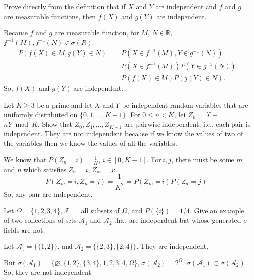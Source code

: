\documentclass[en, normal, 11pt, black]{elegantnote}
\newenvironment{exercise}[1]{\begin{tcolorbox}[colback=black!15, colframe=black!80, breakable, title=#1]}{\end{tcolorbox}}
\renewenvironment{proof}{\begin{tcolorbox}[colback=white, colframe=black!50, breakable, title=Proof. ]\setlength{\parskip}{0.8em}}{\,\\\rightline{$\square$}\end{tcolorbox}}
\begin{document}
    \begin{exercise}{2.1.6}
        Prove directly from the definition that if $X$ and $Y$ are independent and $f$ and $g$ are measurable functions, then $f(X)$ and $g(Y)$ are independent. 
    \end{exercise}

    \begin{proof}
        Because $f$ and $g$ are measurable function, for $M$, $N\in\mathbb{R}$, $f^{-1}(M), f^{-1}(N)\in\sigma(R)$. 
        \[
            \begin{aligned}
                P(f(X) \in M, g(Y) \in N) &=P\left(X \in f^{-1}(M), Y \in g^{-1}(N)\right) \\
                &=P\left(X \in f^{-1}(M)\right) P\left(Y \in g^{-1}(N)\right) \\
                &=P(f(X) \in M) P(g(Y) \in N). 
            \end{aligned}
        \]
        So, $f(X)$ and $g(Y)$ are independent. 
    \end{proof}

    \begin{exercise}{2.1.7}
        Let $K \geq 3$ be a prime and let $X$ and $Y$ be independent random variables that are uniformly distributed on $\{0,1, \ldots, K-1\} .$ For $0 \leq n<K$, let $Z_{n}=X+$ $n Y \bmod K$. Show that $Z_{0}, Z_{1}, \ldots, Z_{K-1}$ are pairwise independent, i.e., each pair is independent. They are not independent because if we know the values of two of the variables then we know the values of all the variables. 
    \end{exercise}

    \begin{proof}
        We know that $P(Z_n=i)=\frac{1}{K}$, $i\in[0,K-1]$. For $i, j$, there must be some $m$ and $n$ which satisfies $Z_n=i$, $Z_m=j$: 
        \[
            P(Z_m=i, Z_n=j)=\frac{1}{K^2}=P(Z_m=i)P(Z_n=j). 
        \]
        So, any pair are independent. 
    \end{proof}
    
    \begin{exercise}{2.1.9}
        Let $\Omega=\{1,2,3,4\}, \mathcal{F}=$ all subsets of $\Omega$, and $P(\{i\})=1 / 4$. Give an example of two collections of sets $\mathcal{A}_{1}$ and $\mathcal{A}_{2}$ that are independent but whose generated $\sigma$-fields are not. 
    \end{exercise}

    \begin{proof}
        Let $\mathcal{A}_1=\{\{1,2\}\}$, and $\mathcal{A}_2=\{\{2,3\},\{2,4\}\}$. They are independent. 
        
        But $\sigma(\mathcal{A}_1)=\{\varnothing, \{1,2\},\{3,4\}, {1,2,3,4}, \Omega\}$, $\sigma(\mathcal{A}_2)=2^\Omega$. $\sigma(\mathcal{A}_1)\subset\sigma(\mathcal{A}_2)$. So, they are not independent. 
    \end{proof}
\end{document}

